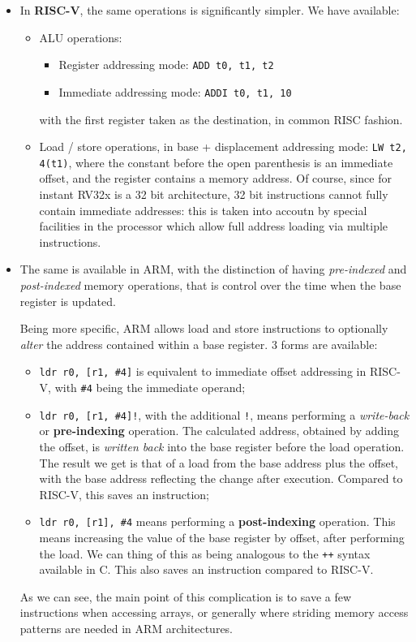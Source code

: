 \documentclass[a4paper,11pt]{article}
\begin{document}
\begin{itemize}
\lstset{language=riscv}

\item In \textbf{RISC-V}, the same operations is significantly simpler. We have available:
		\begin{itemize}
			\item ALU operations:
				\begin{itemize}
					\item Register addressing mode: \lstinline|ADD t0, t1, t2|
					\item Immediate addressing mode: \lstinline|ADDI t0, t1, 10|
				\end{itemize}
				with the first register taken as the destination, in common RISC fashion.
			\item Load / store operations, in base + displacement addressing mode: \lstinline|LW t2, 4(t1)|, where the constant before the open parenthesis is an immediate offset, and the register contains a memory address. Of course, since for instant RV32x is a 32 bit architecture, 32 bit instructions cannot fully contain immediate addresses: this is taken into accoutn by special facilities in the processor which allow full address loading via multiple instructions.
		\end{itemize}


\lstset{language=arm}

\item The same is available in ARM, with the distinction of having \textit{pre-indexed} and \textit{post-indexed} memory operations, that is control over the time when the base register is updated.

		Being more specific, ARM allows load and store instructions to optionally \textit{alter} the address contained within a base register.
		3 forms are available:
		\begin{itemize}
			\item \lstinline|ldr r0, [r1, #4]| is equivalent to immediate offset addressing in RISC-V, with \lstinline|#4| being the immediate operand;
			\item \lstinline|ldr r0, [r1, #4]!|, with the additional \lstinline|!|, means performing a \textit{write-back} or \textbf{pre-indexing} operation. The calculated address, obtained by adding the offset, is \textit{written back} into the base register before the load operation. The result we get is that of a load from the base address plus the offset, with the base address reflecting the change after execution. Compared to RISC-V, this saves an instruction;
			\item \lstinline|ldr r0, [r1], #4| means performing a \textbf{post-indexing} operation. This means increasing the value of the base register by offset, after performing the load. We can thing of this as being analogous to the \lstinline|++| syntax available in C. This also saves an instruction compared to RISC-V. 
		\end{itemize}

	As we can see, the main point of this complication is to save a few instructions when accessing arrays, or generally where striding memory access patterns are needed in ARM architectures.
\end{itemize}
\end{document}
